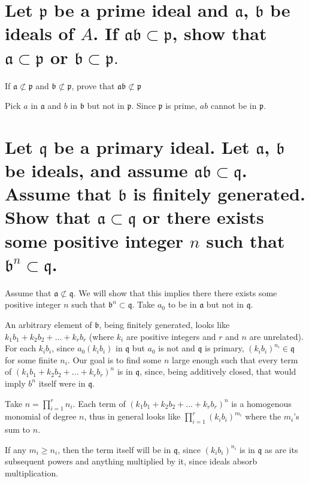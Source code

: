 \documentclass{article}
\begin{document}
\section{Let $\mathfrak{p}$ be a prime ideal and $\mathfrak{a}$, $\mathfrak{b}$ be ideals of $A$. If $\mathfrak{a b} \subset \mathfrak{p}$, show that $\mathfrak{a} \subset \mathfrak{p}$ or $\mathfrak{b} \subset \mathfrak{p}.$}

If $\mathfrak{a} \not\subset \mathfrak{p}$ and $\mathfrak{b} \not\subset \mathfrak{p}$, prove that $\mathfrak{ab} \not\subset \mathfrak{p}$

Pick $a$ in $\mathfrak{a}$ and $b$ in $\mathfrak{b}$ but not in $\mathfrak{p}$. Since $\mathfrak{p}$ is prime, $ab$ cannot be in $\mathfrak{p}$.


\section{Let $\mathfrak{q}$ be a primary ideal. Let $\mathfrak{a}$, $\mathfrak{b}$ be ideals, and assume $\mathfrak{ab} \subset \mathfrak{q}$. Assume that $\mathfrak{b}$ is finitely generated. Show that $\mathfrak{a} \subset  \mathfrak{q}$ or there exists some positive integer $n$ such that $\mathfrak{b}^n \subset \mathfrak{q}$.}

Assume that $\mathfrak{a} \not\subset \mathfrak{q}$. We will show that this implies there there exists some positive integer $n$ such that $\mathfrak{b}^n \subset \mathfrak{q}$. Take $a_0$ to be in $\mathfrak{a}$ but not in $\mathfrak{q}$. 

An arbitrary element of $\mathfrak{b}$, being finitely generated, looks like $k_1 b_1 + k_2 b_2 + ... + k_r b_r$ (where $k_i$ are positive integers and $r$ and $n$ are unrelated). For each $k_i b_i$, since $a_0 (k_i b_i)$ in $\mathfrak{q}$ but $a_0$ is not and $\mathfrak{q}$ is primary, $(k_i b_i)^{n_i} \in \mathfrak{q}$ for some finite $n_i$. Our goal is to find some $n$ large enough such that every term of $(k_1 b_1 + k_2 b_2 + ... + k_r b_r)^n$ is in $\mathfrak{q}$, since, being additively closed, that would imply $b^n$ itself were in $\mathfrak{q}$.

Take $n=\prod_{i=1}^{r} n_i$. Each term of $(k_1 b_1 + k_2 b_2 + ... + k_r b_r)^n$ is a homogenous monomial of degree $n$, thus in general looks like $\prod_{i=1}^{r} (k_i b_i)^{m_i}$ where the $m_i$'s sum to $n$.

If any $m_i \ge n_i$, then the term itself will be in $\mathfrak{q}$, since $(k_i b_i)^{n_i}$ is in $\mathfrak{q}$ as are its subsequent powers and anything multiplied by it, since ideals absorb multiplication. 
\end{document}
